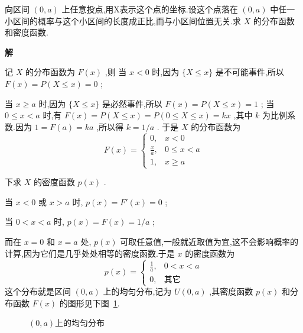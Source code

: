 \begin{example}\label{exam:2.1.11}
	向区间 $ (0,a) $ 上任意投点,用X表示这个点的坐标.设这个点落在 $ (0,a) $ 中任一小区间的概率与这个小区间的长度成正比,而与小区间位置无关.求 $ X $ 的分布函数和密度函数.
	
	\textbf{解}
	
	记 $ X $ 的分布函数为 $ F(x) $ ,则
	当 $ x<0 $ 时,因为 $ \{X \leqslant x\} $ 是不可能事件,所以 $ F(x)=P(X \leqslant x)=0 $ ;
	
	当 $ x \geqslant a $ 时,因为 $ \{ X \leqslant x \} $ 是必然事件,所以 $ F(x)=P(X \leqslant x)=1 $ ;
	当 $ 0 \leqslant x<a $ 时,有 $ F(x)=P(X \leqslant x)=P(0 \leqslant X \leqslant x)=k x $ ,其中 $ k $ 为比例系数.因为 $ 1=F(a)=ka $ ,所以得 $ k=1/a $ .
	于是 $ X $ 的分布函数为	
	\[ 
	F(x)=\left\{\begin{array}{ll}{0,} & {x<0} \\ {\frac{x}{a},} & {0 \leqslant x<a} \\ {1,} & {x \geqslant a}\end{array}\right.
	\]
	
	
	下求 $ X $ 的密度函数 $ p(x) $ .
	
	当 $ x<0 $ 或 $ x>a $ 时, $ p(x)=F'(x)=0 $ ;
	
	当 $ 0<x<a $ 时, $ p(x)=F(x)=1/a $ ;
	
	而在 $ x=0 $ 和 $ x=a $ 处, $ p(x) $ 可取任意值,一般就近取值为宜,这不会影响概率的计算,因为它们是几乎处处相等的密度函数.于是 $ x $ 的密度函数为
	\[ 
	p(x)=\left\{\begin{array}{ll}
	{\frac{1}{a},} & {0<x<a} \\ 
	{0,} & {\text{其它}}
	\end{array}\right.
	\]
	这个分布就是区间 $ (0,a) $ 上的均匀分布,记为 $ U(0,a) $ ,其密度函数 $ p(x) $ 
	和分布函数 $ F(x) $ 的图形见下图~\ref{fig:2.1.10}.
\end{example}



\begin{figure}[!ht]
    \centering
    \hspace{2cm}
    \caption{$(0,a)$上的均匀分布}\label{fig:2.1.10}
\end{figure}

